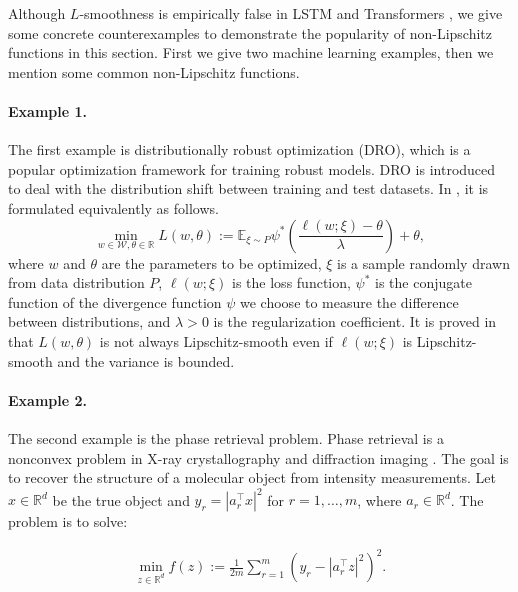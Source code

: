 \documentclass{article} %
\theoremstyle{plain}
\theoremstyle{definition}
\theoremstyle{remark}
\begin{document}
Although $L$-smoothness is empirically false in LSTM \citep{zhang2019gradient} and Transformers \citep{crawshaw2022robustness}, we give some concrete counterexamples to demonstrate the popularity of non-Lipschitz functions in this section. First we give two machine learning examples, then we mention some common non-Lipschitz functions.

\paragraph{Example 1.}\label{eg:DRO} The first example is distributionally robust optimization (DRO), which is a popular optimization framework for training robust models. DRO is introduced to deal with the distribution shift between training and test datasets. In \citep{levy2020large}, it is formulated equivalently as follows.
\begin{equation}
    \min_{w\in \mathcal{W}, \theta \in \mathbb{R}} L(w,\theta) := \mathbb{E}_{\xi \sim P} \psi^*\left( \frac{\ell(w; \xi) - \theta}{\lambda} \right) + \theta,\label{eq:DRO}
\end{equation}
where $w$ and $\theta$ are the parameters to be optimized, $\xi$ is a sample randomly drawn from data distribution $P$, $\ell(w; \xi)$ is the loss function, $\psi^*$ is the conjugate function of the divergence function $\psi$ we choose to measure the difference between distributions, and $\lambda>0$ is the regularization coefficient. It is proved in \citet{jin2021non} that $L(w,\theta)$ is not always Lipschitz-smooth even if $\ell(w;\xi)$ is Lipschitz-smooth and the variance is bounded.

\paragraph{Example 2.}\label{eg:phase} The second example is the phase retrieval problem. Phase retrieval is a nonconvex problem in X-ray crystallography and diffraction imaging \citep{drenth2007principles, miao1999extending}. The goal is to recover the structure of a molecular object from intensity measurements. Let \( x \in \mathbb{R}^d \) be the true object and \( y_r = |a_r^\top x|^2 \) for \( r = 1, \ldots, m \), where \( a_r \in \mathbb{R}^d \). The problem is to solve:

\begin{align}
\min_{z \in \mathbb{R}^d} f(z) := \frac{1}{2m} \sum_{r=1}^m (y_r - |a_r^\top z|^2)^2.\label{obj_phase}
\end{align}
\end{document}

